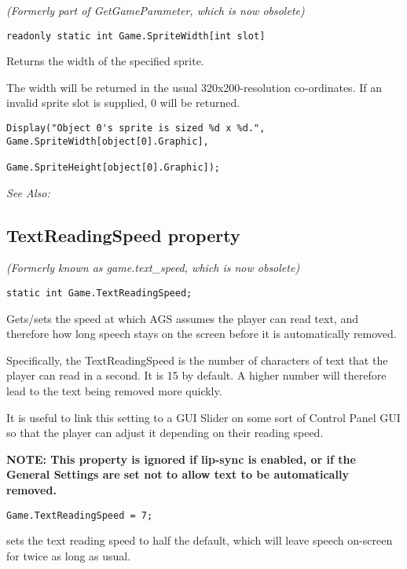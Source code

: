 \it{(Formerly part of GetGameParameter, which is now obsolete)}

\begin{verbatim}
readonly static int Game.SpriteWidth[int slot]
\end{verbatim}
Returns the width of the specified sprite.

The width will be returned in the usual 320x200-resolution co-ordinates. If an invalid
sprite slot is supplied, 0 will be returned.

\begin{verbatim}
Display("Object 0's sprite is sized %d x %d.", Game.SpriteWidth[object[0].Graphic],
                                               Game.SpriteHeight[object[0].Graphic]);
\end{verbatim}

\it{See Also:} 


\subsection{TextReadingSpeed property}\label{Game.TextReadingSpeed}%

\it{(Formerly known as game.text_speed, which is now obsolete)}

\begin{verbatim}
static int Game.TextReadingSpeed;
\end{verbatim}
Gets/sets the speed at which AGS assumes the player can read text, and therefore how
long speech stays on the screen before it is automatically removed.

Specifically, the TextReadingSpeed is the number of characters of text that the player
can read in a second. It is 15 by default. A higher number will therefore lead to the
text being removed more quickly.

It is useful to link this setting to a GUI Slider on some sort of Control Panel GUI
so that the player can adjust it depending on their reading speed.

\bf{NOTE:} This property is ignored if lip-sync is enabled, or if the General Settings
are set not to allow text to be automatically removed.

\begin{verbatim}
Game.TextReadingSpeed = 7;
\end{verbatim}
sets the text reading speed to half the default, which will leave speech on-screen
for twice as long as usual.

